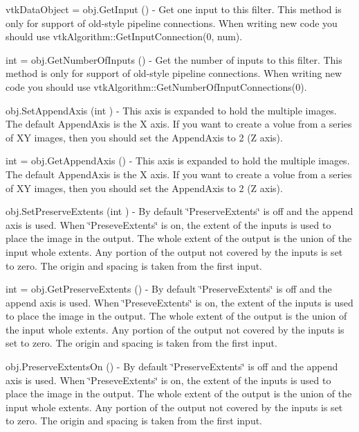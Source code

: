 \begin{DoxyItemize}
\item {\ttfamily vtk\-Data\-Object = obj.\-Get\-Input ()} -\/ Get one input to this filter. This method is only for support of old-\/style pipeline connections. When writing new code you should use vtk\-Algorithm\-::\-Get\-Input\-Connection(0, num).  
\item {\ttfamily int = obj.\-Get\-Number\-Of\-Inputs ()} -\/ Get the number of inputs to this filter. This method is only for support of old-\/style pipeline connections. When writing new code you should use vtk\-Algorithm\-::\-Get\-Number\-Of\-Input\-Connections(0).  
\item {\ttfamily obj.\-Set\-Append\-Axis (int )} -\/ This axis is expanded to hold the multiple images. The default Append\-Axis is the X axis. If you want to create a volue from a series of X\-Y images, then you should set the Append\-Axis to 2 (Z axis).  
\item {\ttfamily int = obj.\-Get\-Append\-Axis ()} -\/ This axis is expanded to hold the multiple images. The default Append\-Axis is the X axis. If you want to create a volue from a series of X\-Y images, then you should set the Append\-Axis to 2 (Z axis).  
\item {\ttfamily obj.\-Set\-Preserve\-Extents (int )} -\/ By default \char`\"{}\-Preserve\-Extents\char`\"{} is off and the append axis is used. When \char`\"{}\-Preseve\-Extents\char`\"{} is on, the extent of the inputs is used to place the image in the output. The whole extent of the output is the union of the input whole extents. Any portion of the output not covered by the inputs is set to zero. The origin and spacing is taken from the first input.  
\item {\ttfamily int = obj.\-Get\-Preserve\-Extents ()} -\/ By default \char`\"{}\-Preserve\-Extents\char`\"{} is off and the append axis is used. When \char`\"{}\-Preseve\-Extents\char`\"{} is on, the extent of the inputs is used to place the image in the output. The whole extent of the output is the union of the input whole extents. Any portion of the output not covered by the inputs is set to zero. The origin and spacing is taken from the first input.  
\item {\ttfamily obj.\-Preserve\-Extents\-On ()} -\/ By default \char`\"{}\-Preserve\-Extents\char`\"{} is off and the append axis is used. When \char`\"{}\-Preseve\-Extents\char`\"{} is on, the extent of the inputs is used to place the image in the output. The whole extent of the output is the union of the input whole extents. Any portion of the output not covered by the inputs is set to zero. The origin and spacing is taken from the first input.  

\end{DoxyItemize}
